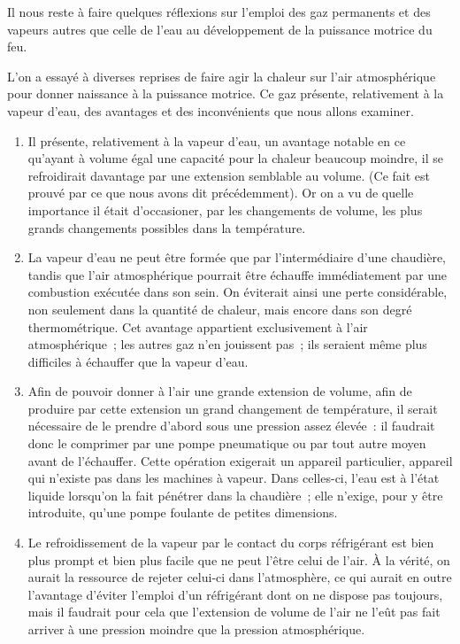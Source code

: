 \documentclass[french,twoside]{book} %
\begin{document}
Il nous reste à faire quelques réflexions sur l’emploi des gaz permanents et des vapeurs autres que celle de l’eau au développement de la puissance motrice du feu.\par
L’on a essayé à diverses reprises de faire agir la chaleur sur l’air atmosphérique pour donner naissance à la puissance motrice. Ce gaz présente, relativement à la vapeur d’eau, des avantages et des inconvénients que nous allons examiner.\par

\begin{enumerate}[itemsep=0pt,topsep=0pt,partopsep=0pt,parskip=0pt]
\item Il présente, relativement à la vapeur d’eau, un avantage notable en ce qu’ayant à volume égal une capacité pour la chaleur beaucoup moindre, il se refroidirait davantage par une extension semblable au volume. (Ce fait est prouvé par ce que nous avons dit précédemment). Or on a vu de quelle importance il était d’occasioner, par les changements de volume, les plus grands changements possibles dans la température.
\item La vapeur d’eau ne peut être formée que par l’intermédiaire d’une chaudière, tandis que l’air atmosphérique pourrait être échauffe immédiatement par une combustion exécutée dans son sein. On éviterait ainsi une perte considérable, non seulement dans la quantité de chaleur, mais encore dans son degré thermométrique. Cet avantage appartient exclusivement à l’air atmosphérique ; les autres gaz n’en jouissent pas ; ils seraient même plus difficiles à échauffer que la vapeur d’eau.
\item Afin de pouvoir donner à l’air une grande extension de volume, afin de produire par cette extension un grand changement de température, il serait nécessaire de le prendre d’abord sous une pression assez élevée : il faudrait donc le comprimer par une pompe pneumatique ou par tout autre moyen avant de l’échauffer. Cette opération exigerait un appareil particulier, appareil qui n’existe pas dans les machines à vapeur. Dans celles-ci, l’eau est à l’état liquide lorsqu’on la fait pénétrer dans la chaudière ; elle n’exige, pour y être introduite, qu’une pompe foulante de petites dimensions.
\item Le refroidissement de la vapeur par le contact du corps réfrigérant est bien plus prompt et bien plus facile que ne peut l’être celui de l’air. À la vérité, on aurait la ressource de rejeter celui-ci dans l’atmosphère, ce qui aurait en outre l’avantage d’éviter l’emploi d’un réfrigérant dont on ne dispose pas toujours, mais il faudrait pour cela que l’extension de volume de l’air ne l’eût pas fait arriver à une pression moindre que la pression atmosphérique.

\end{enumerate}
\end{document}
